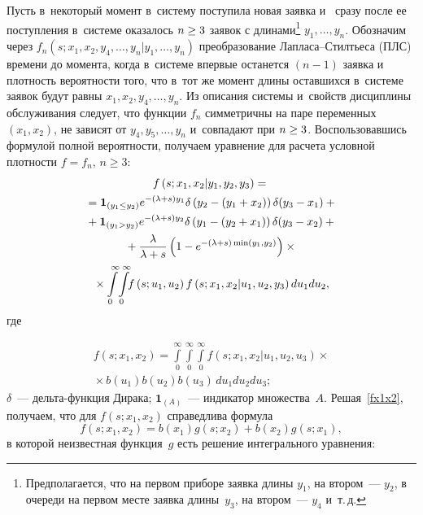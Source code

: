 \begin{multicols}{2}
Пусть в~некоторый момент в~систему поступила новая заявка и~
сразу после ее поступления в~системе оказалось $n\hm\ge 3$ заявок
с длинами\footnote{Предполагается, что 
на первом приборе заявка длины $y_1$, на втором~--- $y_2$,
в очереди на первом месте заявка длины~$y_3$, 
на втором~--- $y_4$ и~т.\,д.} $y_1,\dots,y_n$. 
Обозначим через $f_n(s;x_1,x_2,y_4,\dots,y_{n}|y_1,\dots,y_n)$
преобразование Лап\-ла\-са--Стилть\-е\-са (ПЛС) времени до момента, когда 
в~системе впервые останется $(n-1)$ заявка и~
плотность вероятности того, что в~тот же момент длины оставшихся 
в~системе заявок будут
равны $x_1,x_2,y_4,\dots,y_{n}$.
Из описания системы и~свойств дисциплины обслуживания
следует, что функции $f_n$ 
симметричны на паре переменных $(x_1,x_2)$,
не зависят от $y_4, y_5, \dots, y_n$ и~совпадают при $n\hm\ge 3$.
Воспользовавшись формулой полной вероятности, получаем уравнение для 
расчета
условной плотности $f=f_n$, $n\ge 3$:
\begin{multline}
\label{fx1x2}
f\left(s;x_1,x_2|y_1,y_2,y_3\right) ={}\\
{}={\mathbf{1}_{(y_1 \le y_2)}}
e^{-(\lambda+s) y_1}
\delta \left ( y_2-(y_1+x_2)\right)
\delta(y_3-x_1)
+{}\\
{}+
{\mathbf{1}_{(y_1>y_2)}}
e^{-(\lambda+s) y_2}
\delta \left ( y_1-(y_2+x_1) \right )
\delta(y_3-x_2)
+{}\\
{}+
\displaystyle\frac{\displaystyle \lambda\mathstrut}{\displaystyle \lambda+ s\mathstrut} \left (1 - e^{-(\lambda+s) \min(y_1,y_2)} 
\right)\times{}\\
\!\!{}\times \int\limits_0^\infty\! \int\limits_0^\infty  \!\!
f\left(s;u_1,u_2\right)
f\left(s;x_1,x_2|u_1,u_2,y_3\right)du_1 du_2,\!\!
\end{multline}
где 

\noindent
\begin{multline*}
f(s;x_1,x_2)=
\int\limits_0^\infty \int\limits_0^\infty 
\int\limits_0^\infty f(s;x_1,x_2|u_1,u_2,u_3)\times{}\\
{}\times b(u_1)b(u_2)b(u_3)\,du_1 du_2 du_3; 
\end{multline*}
$\delta$~--- дельта-функция Дирака; 
${\mathbf{1}_{(A)}}$~--- индикатор множества~$A$.
Решая~\eqref{fx1x2}, получаем, что для $f(s;x_1,x_2)$
справедлива формула 
$$
f\left(s;x_1,x_2\right)=b\left(x_1\right)g\left(s;x_2\right)+b\left(x_2\right)
g\left(s;x_1\right),
$$
в которой неизвестная функция~$g$ есть решение интегрального уравнения: 


\end{multicols}
